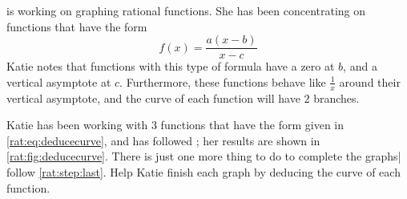 \begin{exercises}
\begin{problem}\label{rat:prob:deduce}
 is working on graphing rational functions. She 
has been concentrating on functions that have the form
\begin{equation}\label{rat:eq:deducecurve}
f(x)=\frac{a(x-b)}{x-c}
\end{equation}
Katie notes that functions with this type of formula have a zero
at $b$, and a vertical asymptote at $c$. Furthermore, these functions
behave like $\frac{1}{x}$ around their vertical asymptote, and the 
curve of each function will have $2$ branches.

Katie has been working with $3$ functions that have the form given 
in \cref{rat:eq:deducecurve}, and has followed ;
her results are shown in \cref{rat:fig:deducecurve}. There is just one
more thing to do to complete the graphs| follow \cref{rat:step:last}.
Help Katie finish each graph by deducing the curve of each function.
    \begin{shortsolution}
    
    
    
    

\end{shortsolution}
\end{problem}
\end{exercises}
